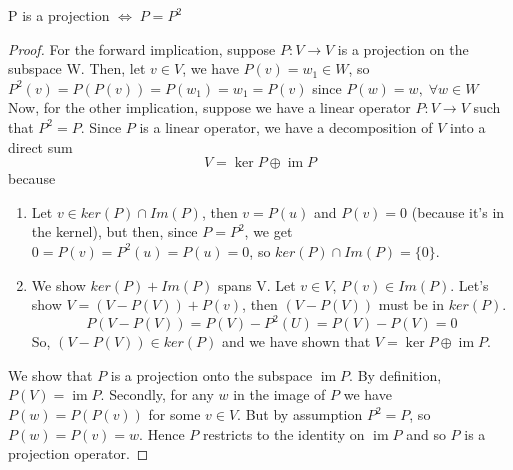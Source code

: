 \documentclass[12pt]{article}
\theoremstyle{definition}
\theoremstyle{remark}
\begin{document}
        \begin{proposition}
            P is a projection $ \iff \; P = P^2$
            \begin{proof}
                For the forward implication, suppose $P: V \rightarrow V$ is a projection on the subspace W. Then, let
                $v \in V$, we have $P(v) = w_1 \in W$, so $P^2(v) = P(P(v)) = P(w_1) = w_1 = P(v)$ since $P(w)=w, \; \forall w \in W$
                \newline
                \newline
                Now, for the other implication, suppose we have a linear operator $P: V \to V$ such that $P^2=P$. Since $P$ is a linear operator, 
                we have a decomposition of $V$ into a direct sum
                $$V= \operatorname{ker}P \oplus \operatorname{im}P$$
                because 
                \begin{enumerate}
                    \item Let $v\in ker(P)\cap Im(P)$, then $v=P(u)$ and $P(v)=0$ (because it's in the kernel), but then, 
                    since $P=P^2$, we get $ 0=P(v)=P^2(u)= P(u)=0$, so $ker(P)\cap Im(P) = \{0\}$.

                    \item We show $ker(P) + Im(P)$ spans V. Let $v\in V$, $P(v) \in Im(P)$. Let's show 
                    $V = (V-P(V))+P(v)$, then $(V-P(V))$ must be in $ker(P)$. 
                    $$P(V-P(V))=P(V) - P^2(U) = P(V)-P(V)=0$$
                    So, $(V-P(V)) \in ker(P)$ and we have shown that $V= \operatorname{ker}P \oplus \operatorname{im}P$.
                \end{enumerate}
                We show that $P$ is a projection onto the subspace $\operatorname{im}P$. By definition, 
                $P(V)=\operatorname{im}P$. Secondly, for any $w$ in the image of $P$ we have $P(w)=P(P(v))$ for some 
                $v \in V$. But by assumption $P^2=P$, so $P(w)=P(v)=w$. Hence $P$ restricts to the identity on 
                $\operatorname{im}P$ and so $P$ is a projection operator. 
            \end{proof}
        \end{proposition}
\end{document}
